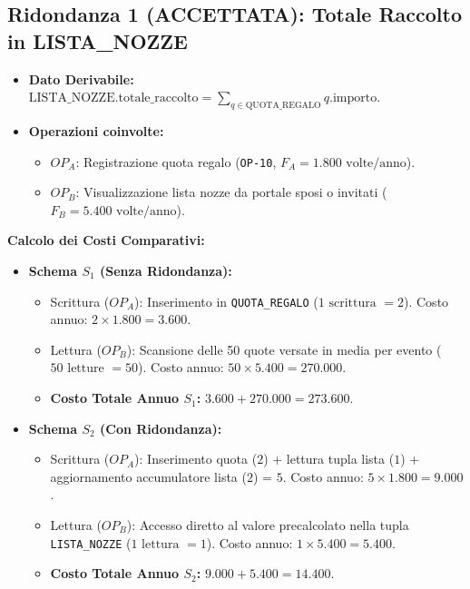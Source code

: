 \subsection{Ridondanza 1 (ACCETTATA): Totale Raccolto in LISTA\_NOZZE}
\begin{itemize}[noitemsep]
    \item \textbf{Dato Derivabile:} $\text{LISTA\_NOZZE.totale\_raccolto} = \sum_{q \in \text{QUOTA\_REGALO}} q.\text{importo}$.
    \item \textbf{Operazioni coinvolte:} 
    \begin{itemize}[noitemsep]
        \item $OP_A$: Registrazione quota regalo (\texttt{OP-10}, $F_A = 1.800 \text{ volte/anno}$).
        \item $OP_B$: Visualizzazione lista nozze da portale sposi o invitati ($F_B = 5.400 \text{ volte/anno}$).
    \end{itemize}
\end{itemize}

\textbf{Calcolo dei Costi Comparativi:}
\begin{itemize}
    \item \textbf{Schema $S_1$ (Senza Ridondanza):}
    \begin{itemize}[noitemsep]
        \item Scrittura ($OP_A$): Inserimento in \texttt{QUOTA\_REGALO} ($1 \text{ scrittura } = 2$). Costo annuo: $2 \times 1.800 = \mathbf{3.600}$.
        \item Lettura ($OP_B$): Scansione delle 50 quote versate in media per evento ($50 \text{ letture } = 50$). Costo annuo: $50 \times 5.400 = \mathbf{270.000}$.
        \item \textbf{Costo Totale Annuo $S_1$:} $3.600 + 270.000 = \mathbf{273.600}$.
    \end{itemize}
    \item \textbf{Schema $S_2$ (Con Ridondanza):}
    \begin{itemize}[noitemsep]
        \item Scrittura ($OP_A$): Inserimento quota ($2$) + lettura tupla lista ($1$) + aggiornamento accumulatore lista ($2$) = $5$. Costo annuo: $5 \times 1.800 = \mathbf{9.000}$.
        \item Lettura ($OP_B$): Accesso diretto al valore precalcolato nella tupla \texttt{LISTA\_NOZZE} ($1 \text{ lettura } = 1$). Costo annuo: $1 \times 5.400 = \mathbf{5.400}$.
        \item \textbf{Costo Totale Annuo $S_2$:} $9.000 + 5.400 = \mathbf{14.400}$.
    \end{itemize}
\end{itemize}


